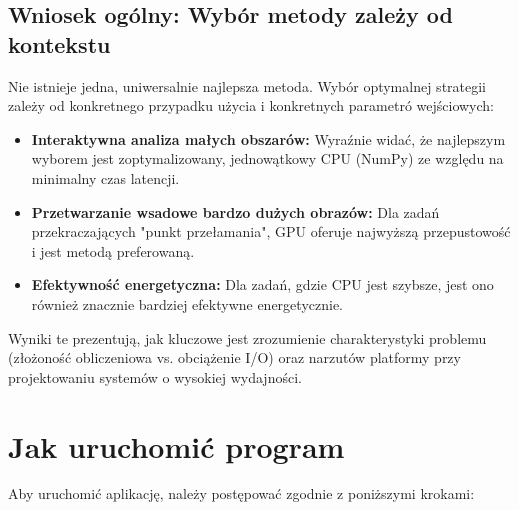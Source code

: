 \documentclass[12pt,a4paper]{article}
\begin{document}
\subsection{Wniosek ogólny: Wybór metody zależy od kontekstu}
Nie istnieje jedna, uniwersalnie najlepsza metoda. Wybór optymalnej strategii zależy od konkretnego przypadku użycia i konkretnych parametró wejściowych:
\begin{itemize}
    \item \textbf{Interaktywna analiza małych obszarów:} Wyraźnie widać, że najlepszym wyborem jest zoptymalizowany, jednowątkowy CPU (NumPy) ze względu na minimalny czas latencji.
    \item \textbf{Przetwarzanie wsadowe bardzo dużych obrazów:} Dla zadań przekraczających "punkt przełamania", GPU oferuje najwyższą przepustowość i jest metodą preferowaną.
    \item \textbf{Efektywność energetyczna:} Dla zadań, gdzie CPU jest szybsze, jest ono również znacznie bardziej efektywne energetycznie.
\end{itemize}
Wyniki te prezentują, jak kluczowe jest zrozumienie charakterystyki problemu (złożoność obliczeniowa vs. obciążenie I/O) oraz narzutów platformy przy projektowaniu systemów o wysokiej wydajności.

\section{Jak uruchomić program}
Aby uruchomić aplikację, należy postępować zgodnie z poniższymi krokami:
\end{document}
